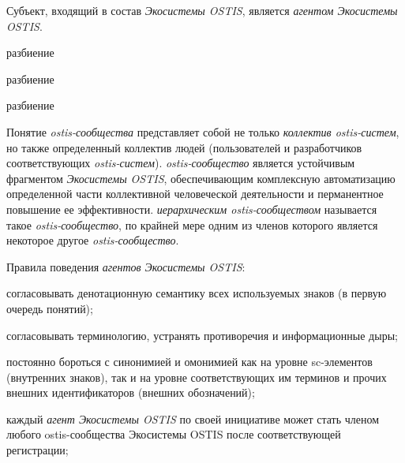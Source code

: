 Субъект, входящий в состав \textit{Экосистемы OSTIS}, является \textit{агентом Экосистемы OSTIS}.

\begin{SCn}
\begin{scnrelfromset}{разбиение}
	\begin{scnindent}
    \begin{scnrelfromset}{разбиение}
    \end{scnrelfromset}
	\end{scnindent}
	\begin{scnindent}
    \begin{scnrelfromset}{разбиение}
    \end{scnrelfromset}
	\end{scnindent}
\end{scnrelfromset}
\end{SCn}

Понятие \textit{ostis-сообщества} представляет собой не только \textit{коллектив ostis-систем}, но также определенный коллектив людей (пользователей и разработчиков соответствующих \textit{ostis-систем}). 
\textit{ostis-сообщество} является устойчивым фрагментом \textit{Экосистемы OSTIS}, обеспечивающим комплексную автоматизацию определенной части коллективной человеческой деятельности и перманентное повышение ее эффективности. 
\textit{иерархическим ostis-сообществом} называется такое \textit{ostis-сообщество}, по крайней мере одним из членов которого является некоторое другое \textit{ostis-сообщество}.

Правила поведения \textit{агентов Экосистемы OSTIS}:
\begin{textitemize}
    \item согласовывать денотационную семантику всех используемых знаков (в первую очередь понятий);
    \item согласовывать терминологию, устранять противоречия и информационные дыры;
    \item постоянно бороться с синонимией и омонимией как на уровне sc-элементов (внутренних знаков), так и на уровне соответствующих им терминов и прочих внешних идентификаторов (внешних обозначений);
    \item каждый \textit{агент Экосистемы OSTIS} по своей инициативе может стать членом любого ostis-сообщества Экосистемы OSTIS после соответствующей регистрации;
\end{textitemize}

